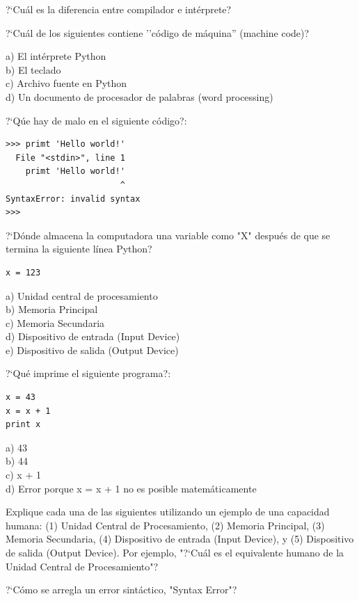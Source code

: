\begin{ex}
?`Cu\'al es la diferencia entre compilador e int\'erprete?
\end{ex}

\begin{ex}
?`Cu\'al de los siguientes contiene ''c\'odigo de m\'aquina'' (machine code)?

a) El int\'erprete Python\\
b) El teclado\\
c) Archivo fuente en Python\\
d) Un documento de procesador de palabras (word processing)
\end{ex}

\begin{ex}
?`Q\'ue hay de malo en el siguiente c\'odigo?:

\beforeverb
\begin{verbatim}
>>> primt 'Hello world!'
  File "<stdin>", line 1
    primt 'Hello world!'
                       ^
SyntaxError: invalid syntax
>>> 
\end{verbatim}
\afterverb

\end{ex}

\begin{ex}
?`D\'onde almacena la computadora una variable como "X" despu\'es de que  
se termina la siguiente l\'inea Python?

\beforeverb
\begin{verbatim}
x = 123
\end{verbatim}
\afterverb
%
a) Unidad central de procesamiento\\
b) Memoria Principal\\
c) Memoria Secundaria\\
d) Dispositivo de entrada (Input Device)\\
e) Dispositivo de salida (Output Device)
\end{ex}

\begin{ex}
?`Qu\'e imprime el siguiente programa?:

\beforeverb
\begin{verbatim}
x = 43
x = x + 1
print x
\end{verbatim}
\afterverb
%
a) 43\\
b) 44\\
c) x + 1\\
d) Error porque x = x + 1 no es posible matem\'aticamente
\end{ex}

\begin{ex}
Explique cada una de las siguientes utilizando un ejemplo de una capacidad humana: 
(1) Unidad Central de Procesamiento, (2) Memoria Principal, (3) Memoria Secundaria, 
(4) Dispositivo de entrada (Input Device), y 
(5) Dispositivo de salida (Output Device).
Por ejemplo, "?`Cu\'al es el equivalente humano de la Unidad Central de Procesamiento"? 
\end{ex}

\begin{ex}
?`C\'omo se arregla un error sint\'actico, "Syntax Error"?
\end{ex}
